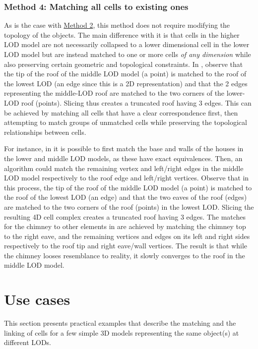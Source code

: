 \subsubsection{Method 4: Matching all cells to existing ones}
\label{sss:method4}

As is the case with \hyperref[sss:method2]{Method 2}, this method does not require modifying the topology of the objects.
The main difference with it is that cells in the higher LOD model are not necessarily collapsed to a lower dimensional cell in the lower LOD model but are instead matched to one or more cells \emph{of any dimension} while also preserving certain geometric and topological constraints.
In , observe that the tip of the roof of the middle LOD model (a point) is matched to the roof of the lowest LOD (an edge since this is a 2D representation) and that the 2 edges representing the middle-LOD roof are matched to the two corners of the lower-LOD roof (points).
Slicing thus creates a truncated roof having 3 edges.
This can be achieved by matching all cells that have a clear correspondence first, then attempting to match groups of unmatched cells while preserving the topological relationships between cells.

For instance, in  it is possible to first match the base and walls of the houses in the lower and middle LOD models, as these have exact equivalences.
Then, an algorithm could match the remaining vertex and left/right edges in the middle LOD model respectively to the roof edge and left/right vertices.
Observe that in this process, the tip of the roof of the middle LOD model (a point) is matched to the roof of the lowest LOD (an edge) and that the two eaves of the roof (edges) are matched to the two corners of the roof (points) in the lowest LOD\@.
Slicing the resulting 4D cell complex creates a truncated roof having 3 edges.
The matches for the chimney to other elements in  are achieved by matching the chimney top to the right eave, and the remaining vertices and edges on its left and right sides respectively to the roof tip and right eave/wall vertices.
The result is that while the chimney looses resemblance to reality, it slowly converges to the roof in the middle LOD model.

\section{Use cases}
\label{se:linking-examples}

This section presents practical examples that describe the matching and the linking of cells for a few simple 3D models representing the same object(s) at different LODs.

